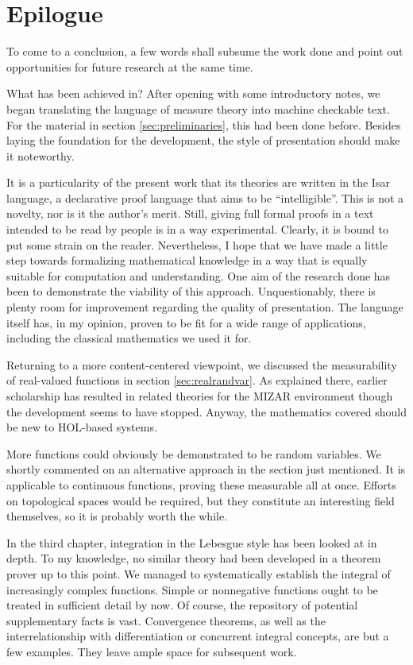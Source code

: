 \chapter{Epilogue}
\label{cha:epilogue}

To come to a conclusion, a few words shall
subsume the work done and point out opportunities for future research at the same time.

What has been achieved in? After opening with some
introductory notes, we began translating the language of measure
theory into machine checkable text. For the material in
section \ref{sec:preliminaries}, this had been done before. Besides laying the
foundation for the development, the style of presentation should make it
noteworthy.  

It is a particularity of the present work that its theories are
written in the Isar language, a declarative proof language that aims
to be ``intelligible''. This is not a novelty, nor is it the author's
merit. Still, giving full formal proofs in a text intended to be read
by people is in a way experimental. Clearly, it is bound to put some
strain on the reader. Nevertheless, I hope that we have made a little
step towards formalizing mathematical knowledge in a way that is
equally suitable for computation and understanding. One aim of the
research done has been to demonstrate the viability of this approach.
Unquestionably, there is plenty room for improvement regarding the
quality of presentation. The language itself has, in my opinion,
proven to be fit for a wide range of applications, including the
classical mathematics we used it for.

Returning to a more content-centered viewpoint, we discussed the
measurability of real-valued functions in section \ref{sec:realrandvar}. As
explained there, earlier scholarship has resulted in related theories
for the MIZAR environment though the development seems to have
stopped. Anyway, the mathematics covered should be new to HOL-based
systems. 

More functions could obviously be demonstrated to be random
variables. We shortly commented on an alternative approach in the
section just mentioned. It is applicable to continuous functions,
proving these measurable all at once. Efforts on topological spaces
would be required, but they constitute an interesting field
themselves, so it is probably worth the while.

In the third chapter, integration in the Lebesgue style
has been looked at in depth. To my knowledge, no similar theory had
been developed in a theorem prover up to this point.  We managed to
systematically establish the integral of increasingly complex
functions. Simple or nonnegative functions ought to be treated in
sufficient detail by now. Of course, the repository of potential
supplementary facts is vast. Convergence theorems, as well as the
interrelationship with differentiation or concurrent integral concepts,
are but a few examples. They leave ample space for subsequent work.

